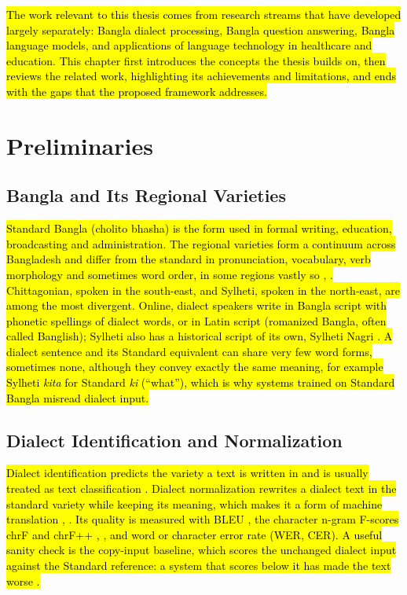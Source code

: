 \hl{The work relevant to this thesis comes from research streams that
have developed largely separately: Bangla dialect processing, Bangla
question answering, Bangla language models, and applications of language
technology in healthcare and education. This chapter first introduces
the concepts the thesis builds on, then reviews the related work,
highlighting its achievements and limitations, and ends with the gaps
that the proposed framework addresses.}

\section{Preliminaries}\label{preliminaries}

\subsection{Bangla and Its Regional Varieties}\label{bangla-and-its-regional-varieties}

\hl{Standard Bangla (cholito bhasha) is the form used in formal writing,
education, broadcasting and administration. The regional varieties form
a continuum across Bangladesh and differ from the standard in
pronunciation, vocabulary, verb morphology and sometimes word order, in
some regions vastly so \cite{jawad2026fivedialects}, \cite{faria2023vashantor}. Chittagonian, spoken in the
south-east, and Sylheti, spoken in the north-east, are among the most
divergent. Online, dialect speakers write in Bangla script with phonetic
spellings of dialect words, or in Latin script (romanized Bangla, often
called Banglish); Sylheti also has a historical script of its own,
Sylheti Nagri \cite{jawad2026fivedialects}. A dialect sentence and its Standard equivalent
can share very few word forms, sometimes none, although they convey
exactly the same meaning, for example Sylheti \emph{kita} for Standard
\emph{ki} (``what''), which is why systems trained on Standard Bangla
misread dialect input.}

\subsection{Dialect Identification and Normalization}\label{dialect-identification-and-normalization}

\hl{Dialect identification predicts the variety a text is written in and
is usually treated as text classification \cite{faria2023vashantor}. Dialect normalization
rewrites a dialect text in the standard variety while keeping its
meaning, which makes it a form of machine translation \cite{faria2023vashantor}, \cite{jawad2026fivedialects}.
Its quality is measured with BLEU \cite{papineni2002bleu}, the character n-gram
F-scores chrF and chrF++ \cite{popovic2015chrf}, \cite{popovic2017chrfpp}, and word or character error
rate (WER, CER). A useful sanity check is the copy-input baseline, which
scores the unchanged dialect input against the Standard reference: a
system that scores below it has made the text worse \cite{jawad2026fivedialects}.}

